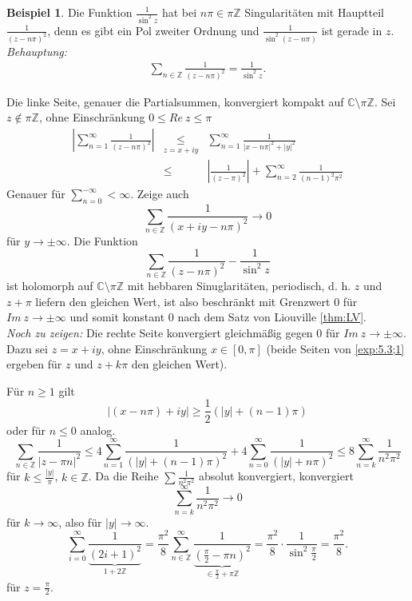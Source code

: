 \documentclass[11pt,titlepage]{article}
\theoremstyle{definition}
\newtheorem{example}[theorem]{Beispiel}
\theoremstyle{remark}
\begin{document}
	\begin{example} \label{exp:5.3}
		Die Funktion $\frac{1}{\sin^2 z}$ hat bei $n\pi\in\pi\mathbb{Z}$ Singularitäten mit Hauptteil 
		$\frac{1}{(z-n\pi)^2}$, denn es gibt ein Pol zweiter Ordnung und $\frac{1}{\sin^2(z-n\pi)}$ ist gerade in $z$. \\
		\textsl{Behauptung:} 
		\begin{eqnarray}
			\sum_{n\in\mathbb{Z}}\frac{1}{(z-n\pi)^2}=\frac{1}{\sin^2 z}. \label{exp:5.3;1}
		\end{eqnarray}
		
		
		
		
		Die linke Seite, genauer die Partialsummen, konvergiert kompakt auf $\mathbb{C}\setminus\pi\mathbb{Z}$.
		Sei $z\notin\pi\mathbb{Z}$, ohne Einschränkung $0\leq Re\  z\leq\pi$
		\begin{eqnarray*}
			\left| \sum_{n=1}^{\infty} \frac{1}{(z-n\pi)^2} \right| &\underset{z=x+iy}{\leq}& \sum_{n=1}^{\infty} 
			\frac{1}{|x-n\pi|^2+|y|^2} \\
			&\leq& \left| \frac{1}{(z-\pi)^2}\right| + \sum_{n=2}^{\infty} \frac{1}{(n-1)^2 \pi^2}
		\end{eqnarray*}
		Genauer für $\sum_{n=0}^{-\infty}<\infty$. Zeige auch
		\[ \sum_{n\in\mathbb{Z}} \frac{1}{(x+iy-n\pi)^2} \to 0 \]
		für $y\to\pm\infty$.
		Die Funktion
		\[ \sum_{n\in\mathbb{Z}} \frac{1}{(z-n\pi)^2}-\frac{1}{\sin^2 z} \]
		ist holomorph auf $\mathbb{C}\setminus \pi\mathbb{Z}$ mit hebbaren Sinuglaritäten, periodisch, d. h. $z$ 
		und $z+\pi$ liefern den gleichen Wert, ist also beschränkt mit Grenzwert $0$ für $Im\ z\to\pm\infty$ und somit 
		konstant $0$ nach dem Satz von Liouville \ref{thm:LV}. \\
		\textsl{Noch zu zeigen:} Die rechte Seite konvergiert gleichmäßig gegen $0$ für $Im\ z\to\pm\infty$. \\
		Dazu sei $z=x+iy$, ohne Einschränkung $x\in [0,\pi]$ (beide Seiten von \ref{exp:5.3;1} ergeben für $z$ 
		und $z+k\pi$ den gleichen Wert). 
		
		
		
		
		Für $n\geq 1$ gilt
		\[ |(x-n\pi)+iy| \geq \frac{1}{2}(|y|+(n-1)\pi) \]
		oder für $n\leq 0$ analog.
		\[ \sum_{n\in\mathbb{Z}}\frac{1}{|z-\pi n|^2} \leq 4\sum_{n=1}^{\infty} \frac{1}{(|y|+(n-1)\pi)^2}+4
		\sum_{n=0}^{\infty} \frac{1}{(|y|+n\pi)^2} \leq 8 \sum_{n=k}^{\infty} \frac{1}{n^2\pi^2} \]
		für $k\leq \frac{|y|}{\pi}$, $k\in\mathbb{Z}$. Da die Reihe $\sum \frac{1}{n^2 \pi^2}$ absolut konvergiert, 
		konvergiert
		\[ \sum_{n=k}^{\infty} \frac{1}{n^2\pi^2} \to 0 \]
		für $k\to\infty$, also für $|y|\to\infty$. 
		\[ \sum_{i=0}^{\infty} \frac{1}{\underbrace{(2i+1)^2}_{1+2\mathbb{Z}}} =\frac{\pi^2}{8}
		\sum_{n\in\mathbb{Z}}^{\infty} \frac{1}{\underbrace{(\frac{\pi}{2}-\pi n)^2}_{\in \frac{\pi}{2}+\pi\mathbb{Z}}}
		=\frac{\pi^2}{8}\cdot \frac{1}{\sin^2 \frac{\pi}{2}}=\frac{\pi^2}{8}. \]
		für $z=\frac{\pi}{2}$.
	\end{example}
	
\end{document}
